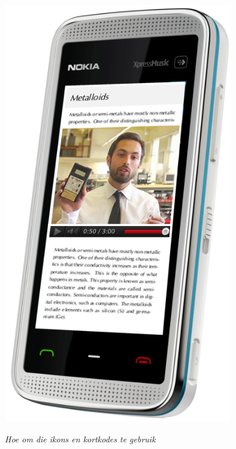 \begin{center}
\begin{minipage}{0.3\textwidth}
\includegraphics[width=0.75\textwidth]{title_images/phone.png}
\end{minipage}
\end{center}

\vspace*{2cm}


{\normalfont\sffamily\fontsize{22}\normalfont\itshape Hoe om die ikons en kortkodes te gebruik
} \par

